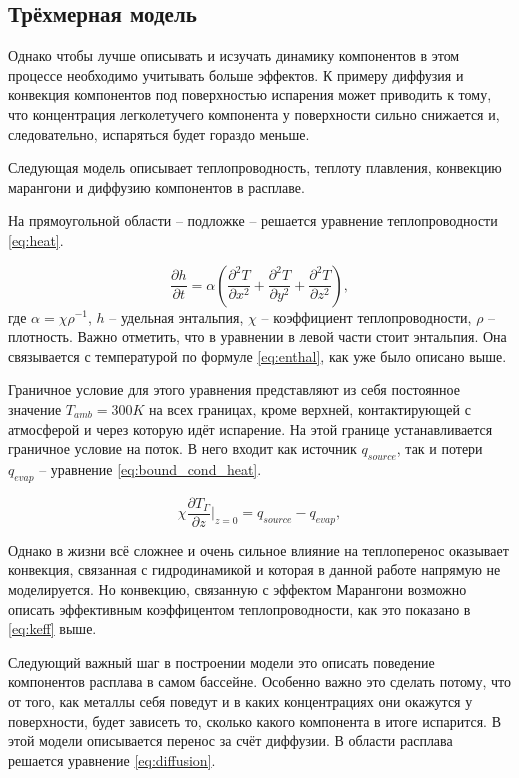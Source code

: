 \subsection{Трёхмерная модель}

Однако чтобы лучше описывать и исзучать динамику компонентов в этом процессе необходимо учитывать больше эффектов. К примеру диффузия и конвекция компонентов под поверхностью испарения может приводить к тому, что концентрация легколетучего компонента у поверхности сильно снижается и, следовательно, испаряться будет гораздо меньше.

Следующая модель описывает теплопроводность, теплоту плавления, конвекцию марангони и диффузию компонентов в расплаве.

На прямоугольной области -- подложке -- решается уравнение теплопроводности \ref{eq:heat}.

\begin{equation}
    \label{eq:heat}
    \frac{\partial h}{\partial t} = \alpha\left(\frac{\partial^2 T}{\partial x^2} + \frac{\partial^2 T}{\partial y^2} + \frac{\partial^2 T}{\partial z^2}\right),
\end{equation}
где $\alpha = \chi \rho^{-1} $, $h$ -- удельная энтальпия, $\chi$ -- коэффициент теплопроводности, $\rho$ -- плотность. Важно отметить, что в уравнении в левой части стоит энтальпия. Она связывается с температурой по формуле \ref{eq:enthal}, как уже было описано выше.

Граничное условие для этого уравнения представляют из себя постоянное значение $T_{amb} = 300K$ на всех границах, кроме верхней, контактирующей с атмосферой и через которую идёт испарение. На этой границе устанавливается граничное условие на поток. В него входит как источник $q_{source}$, так и потери $q_{evap}$ -- уравнение \ref{eq:bound_cond_heat}.

\begin{equation}
    \label{eq:bound_cond_heat}
    \chi \frac{\partial T_{\Gamma}}{\partial z}  \big|_{z=0} = q_{source} - q_{evap},
\end{equation}

Однако в жизни всё сложнее и очень сильное влияние на теплоперенос оказывает конвекция, связанная с гидродинамикой и которая в данной работе напрямую не моделируется. Но конвекцию, связанную с эффектом Марангони возможно описать эффективным коэффицентом теплопроводности, как это показано в \ref{eq:keff} выше. 

Следующий важный шаг в построении модели это описать поведение компонентов расплава в самом бассейне. Особенно важно это сделать потому, что от того, как металлы себя поведут и в каких концентрациях они окажутся у поверхности, будет зависеть то, сколько какого компонента в итоге испарится. В этой модели описывается перенос за счёт диффузии. В области расплава решается уравнение \ref{eq:diffusion}.

